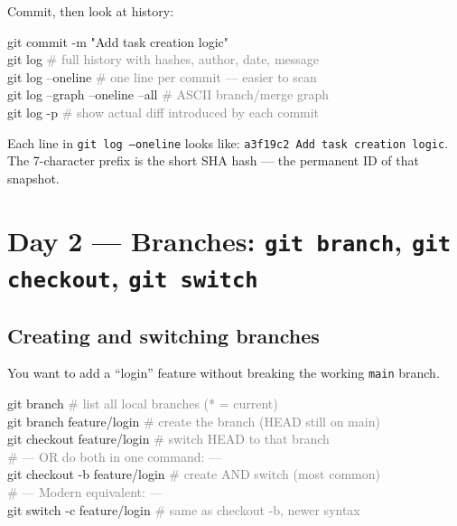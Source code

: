 \documentclass[10pt,a4paper]{article}
\newenvironment{codebox}{%
  \begin{mdframed}[backgroundcolor=codebg, linewidth=0pt,
    innerleftmargin=6pt, innerrightmargin=6pt,
    innertopmargin=4pt, innerbottommargin=4pt]%
  \small\ttfamily
}{%
  \end{mdframed}%
}
\newcommand{\cmd}[1]{\texttt{\small #1}}
\begin{document}
Commit, then look at history:

\begin{codebox}
git commit -m "Add task creation logic"\\
git log                         \textcolor{gray}{\# full history with hashes, author, date, message}\\
git log --oneline               \textcolor{gray}{\# one line per commit --- easier to scan}\\
git log --graph --oneline --all \textcolor{gray}{\# ASCII branch/merge graph}\\
git log -p                      \textcolor{gray}{\# show actual diff introduced by each commit}
\end{codebox}

Each line in \cmd{git log --oneline} looks like: \texttt{a3f19c2 Add task creation logic}.
The 7-character prefix is the short SHA hash --- the permanent ID of that snapshot.

\section{Day 2 --- Branches: \texttt{git branch}, \texttt{git checkout}, \texttt{git switch}}

\subsection{Creating and switching branches}

You want to add a ``login'' feature without breaking the working \texttt{main} branch.

\begin{codebox}
git branch                      \textcolor{gray}{\# list all local branches (* = current)}\\
git branch feature/login        \textcolor{gray}{\# create the branch (HEAD still on main)}\\
git checkout feature/login      \textcolor{gray}{\# switch HEAD to that branch}\\
\textcolor{gray}{\# --- OR do both in one command: ---}\\
git checkout -b feature/login   \textcolor{gray}{\# create AND switch (most common)}\\
\textcolor{gray}{\# --- Modern equivalent: ---}\\
git switch -c feature/login     \textcolor{gray}{\# same as checkout -b, newer syntax}
\end{codebox}
\end{document}
